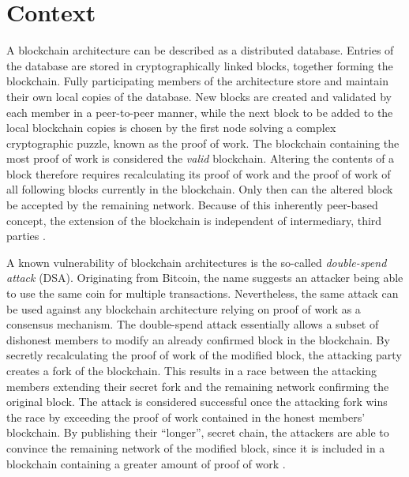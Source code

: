 \documentclass[a4paper,12pt,twoside]{report}
\begin{document}
\section{Context}
A blockchain architecture can be described as a distributed database. Entries of the database are stored in cryptographically linked blocks, together forming the blockchain. Fully participating members of the architecture store and maintain their own local copies of the database. New blocks are created and validated by each member in a peer-to-peer manner, while the next block to be added to the local blockchain copies is chosen by the first node solving a complex cryptographic puzzle, known as the proof of work. The blockchain containing the most proof of work is considered the \textit{valid} blockchain. Altering the contents of a block therefore requires recalculating its proof of work and the proof of work of all following blocks currently in the blockchain. Only then can the altered block be accepted by the remaining network. Because of this inherently peer-based concept, the extension of the blockchain is independent of intermediary, third parties \cite{antonopoulos2017mastering}. 

A known vulnerability of blockchain architectures is the so-called \textit{double-spend attack} (DSA). Originating from Bitcoin, the name suggests an attacker being able to use the same coin for multiple transactions. Nevertheless, the same attack can be used against any blockchain architecture relying on proof of work as a consensus mechanism. The double-spend attack essentially allows a subset of dishonest members to modify an already confirmed block in the blockchain. By secretly recalculating the proof of work of the modified block, the attacking party creates a fork of the blockchain. This results in a race between the attacking members extending their secret fork and the remaining network confirming the original block. The attack is considered successful once the attacking fork wins the race by exceeding the proof of work contained in the honest members' blockchain. By publishing their ``longer'', secret chain, the attackers are able to convince the remaining network of the modified block, since it is included in a blockchain containing a greater amount of proof of work \cite{nakamoto2008bitcoin,HBDSA}.
\end{document}
